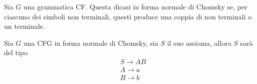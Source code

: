 \documentclass{subfiles}
\begin{document}
\begin{Definition*}
    Sia \(G\) una grammatica CF. Questa dicasi in forma normale di Chomsky se, per ciascuno dei simboli non terminali, questi produce una coppia di non terminali o un terminale.
\end{Definition*}
\begin{Example*}
    Sia \(G\) una CFG in forma normale di Chomsky, sia \(S\) il suo assioma, allora \(S\) sarà del tipo
    \[\begin{aligned}
             & S \to AB \\
             & A \to a  \\
             & B \to b  \\
        \end{aligned}\]
\end{Example*}
\clearpage
\end{document}
